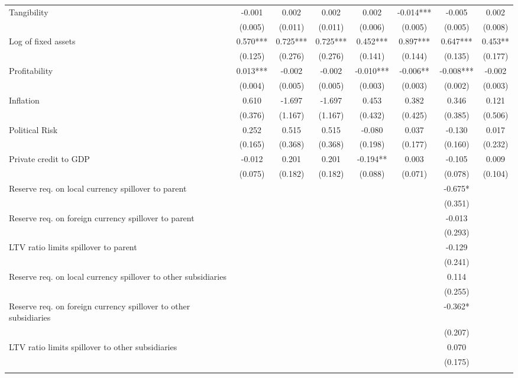 \begin{tabular}{lccccccc}
Tangibility & -0.001 & 0.002 & 0.002 & 0.002 & -0.014*** & -0.005 & 0.002 \\
 & (0.005) & (0.011) & (0.011) & (0.006) & (0.005) & (0.005) & (0.008) \\
Log of fixed assets & 0.570*** & 0.725*** & 0.725*** & 0.452*** & 0.897*** & 0.647*** & 0.453** \\
 & (0.125) & (0.276) & (0.276) & (0.141) & (0.144) & (0.135) & (0.177) \\
Profitability & 0.013*** & -0.002 & -0.002 & -0.010*** & -0.006** & -0.008*** & -0.002 \\
 & (0.004) & (0.005) & (0.005) & (0.003) & (0.003) & (0.002) & (0.003) \\
Inflation & 0.610 & -1.697 & -1.697 & 0.453 & 0.382 & 0.346 & 0.121 \\
 & (0.376) & (1.167) & (1.167) & (0.432) & (0.425) & (0.385) & (0.506) \\
Political Risk & 0.252 & 0.515 & 0.515 & -0.080 & 0.037 & -0.130 & 0.017 \\
 & (0.165) & (0.368) & (0.368) & (0.198) & (0.177) & (0.160) & (0.232) \\
Private credit to GDP & -0.012 & 0.201 & 0.201 & -0.194** & 0.003 & -0.105 & 0.009 \\
 & (0.075) & (0.182) & (0.182) & (0.088) & (0.071) & (0.078) & (0.104) \\
Reserve req. on local currency spillover to parent &  &  &  &  &  & -0.675* &  \\
 &  &  &  &  &  & (0.351) &  \\
Reserve req. on foreign currency spillover to parent &  &  &  &  &  & -0.013 &  \\
 &  &  &  &  &  & (0.293) &  \\
LTV ratio limits spillover to parent &  &  &  &  &  & -0.129 &  \\
 &  &  &  &  &  & (0.241) &  \\
Reserve req. on local currency spillover to other subsidiaries &  &  &  &  &  & 0.114 &  \\
 &  &  &  &  &  & (0.255) &  \\
Reserve req. on foreign currency spillover to other subsidiaries &  &  &  &  &  & -0.362* &  \\
 &  &  &  &  &  & (0.207) &  \\
LTV ratio limits spillover to other subsidiaries &  &  &  &  &  & 0.070 &  \\
 &  &  &  &  &  & (0.175) &  \\
 &  &  &  &  &  &  &  \\

\end{tabular}
